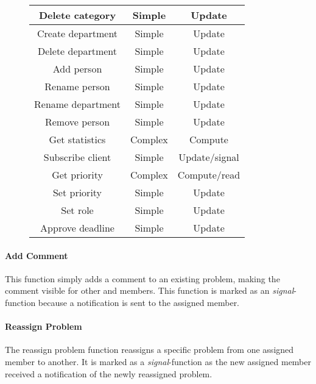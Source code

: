 \begin{figure}[h]
\begin{center}
\begin{tabular}{|c|c|c|}
Delete category & Simple & Update \\ \hline%
Create department & Simple & Update \\ \hline%
Delete department & Simple & Update \\ \hline%
Add person & Simple & Update \\ \hline%
Rename person & Simple & Update \\ \hline%
Rename department & Simple & Update \\ \hline%
Remove person & Simple & Update \\ \hline%
Get statistics & Complex & Compute \\ \hline%
Subscribe client & Simple & Update/signal \\ \hline%
Get priority & Complex & Compute/read \\ \hline%
Set priority & Simple & Update \\ \hline%
Set role & Simple & Update \\ \hline%
Approve deadline & Simple & Update \\ \hline%

\end{tabular}
\end{center}
\label{tab:functionlist}
\end{figure}


\paragraph{Add Comment} This function simply adds a comment to an existing problem, making the comment visible for other \client{} and \astaff[] members. This function is marked as an \textit{signal}-function because a notification is sent to the assigned \astaff[] member.

\paragraph{Reassign Problem} The reassign problem function reassigns a specific problem from one assigned \astaff[] member to another. It is marked as a \textit{signal}-function as the new assigned \astaff[] member received a notification of the newly reassigned problem. 

